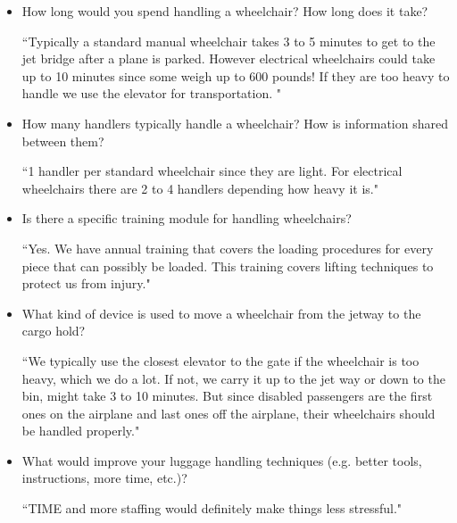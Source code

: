 \begin{itemize}
\item How long would you spend handling a wheelchair? How long does it take?

``Typically a standard manual wheelchair takes 3 to 5 minutes to get to the jet bridge after a plane is parked. However electrical wheelchairs could take up to 10 minutes since some weigh up to 600 pounds! If they are too heavy to handle we use the elevator for transportation. "

\item How many handlers typically handle a wheelchair? How is information shared between them? 

``1 handler per standard wheelchair since they are light. For electrical wheelchairs there are 2 to 4 handlers depending how heavy it is."

\item  Is there a specific training module for handling wheelchairs? 

``Yes. We have annual training that covers the loading procedures for every piece that can possibly be loaded. This training covers lifting techniques to protect us from injury."

\item What kind of device is used to move a wheelchair from the jetway to the cargo hold?

``We typically use the closest elevator to the gate if the wheelchair is too heavy, which we do a lot. If not, we carry it up to the jet way or down to the bin, might take 3 to 10 minutes. But since disabled passengers are the first ones on the airplane and last ones off the airplane, their wheelchairs should be handled properly."

\item What would improve your luggage handling techniques (e.g. better tools, instructions, more time, etc.)?

``TIME and more staffing would definitely make things less stressful."
 
\end{itemize}